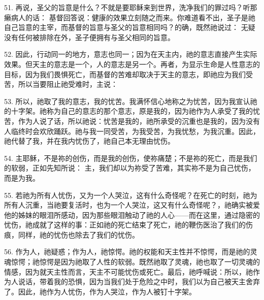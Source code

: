 51. 再说，圣父的旨意是什么？不就是要耶稣来到世界，洗净我们的罪过吗？听那癞病人的话： 基督回答说：健康的效果立刻随之而来。你难道看不出，圣子是祂自己旨意的主宰，而基督的旨意与圣父的旨意相同吗？的确，既然祂说过： 无疑没有任何被排除在外，圣子便拥有与圣父相同的旨意。\par

\par

52. 因此，行动同一的地方，意志也同一；因为在天主内，祂的意志直接产生实际效果。但天主的意志是一个，人的意志是另一个。再者，为显示生命是人性意志的目标，因为我们畏惧死亡，而基督的苦难却取决于天主的意志，即祂应为我们受苦，所以当要阻止祂受难时，主说：\par

53. 所以，祂取了我的意志，我的忧苦。我满怀信心地称之为忧苦，因为我宣认祂的十字架。祂称为自己的意志的那个意志，原是我的，因为祂作为人承受了我的忧苦，作为人说了话，所以祂说：忧苦是我的，祂所承受的沉重也是我的，因为没有人临终时会欢欣踊跃。祂与我一同受苦，为我受苦，为我忧愁，为我沉重。因此，祂代替了我，并在我内忧伤了，祂自己本无理由忧伤。\par

54. 主耶稣，不是祢的创伤，而是我的创伤，使祢痛楚；不是祢的死亡，而是我们的软弱，正如先知所说： 主，我们却以为祢受了苦难，其实祢不是为自己忧伤，而是为我。\par

55. 若祂为所有人忧伤，又为一个人哭泣，这有什么奇怪呢？在死亡的时刻，祂为所有人沉重，当祂要复活时，也为一个人哭泣，这又有什么奇怪呢？，祂确实被爱他的姊妹的眼泪所感动，因为那些眼泪触动了祂的人心——而在这里，通过隐密的忧伤，祂成就了这样的事：正如祂的死亡结束了死亡，祂的鞭伤医治了我们的伤痕，同样，祂的忧伤也除去了我们的忧伤。\par

56. 作为人，祂疑惑；作为人，祂惊愕。祂的权能和天主性并不惊愕，而是祂的灵魂惊愕；祂惊愕是因为祂取了人性的软弱。既然祂取了灵魂，祂也取了一切灵魂的情感，因为就天主性而言，天主不可能忧伤或死亡。最后，祂呼喊说：所以，祂作为人说话，带着我的恐惧，因为当我们处于危险之中时，我们以为自己被天主舍弃了。因此，祂作为人忧伤，作为人哭泣，作为人被钉十字架。\par

